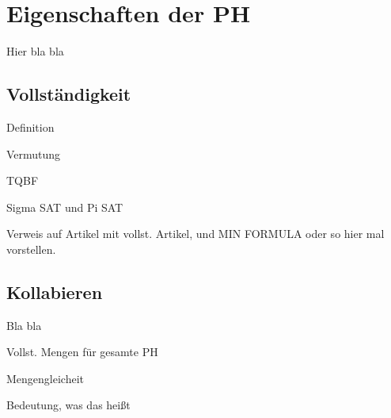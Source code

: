 \section{Eigenschaften der PH}
\begin{frame}
    Hier bla bla
\end{frame}

\subsection{Vollständigkeit}
\begin{frame}
    Definition
\end{frame}

\begin{frame}
    Vermutung
\end{frame}

\begin{frame}
    TQBF
\end{frame}

\begin{frame}
    Sigma SAT und Pi SAT
\end{frame}

\begin{frame}
    Verweis auf Artikel mit vollst. Artikel, und MIN FORMULA oder so hier mal vorstellen.
\end{frame}

\subsection{Kollabieren}
\begin{frame}
    Bla bla
\end{frame}

\begin{frame}
    Vollst. Mengen für gesamte PH
\end{frame}

\begin{frame}
     Mengengleicheit
\end{frame}

\begin{frame}
    Bedeutung, was das heißt
\end{frame}